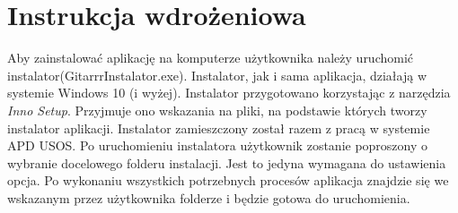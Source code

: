 \chapter{Instrukcja wdrożeniowa}

Aby zainstalować aplikację na komputerze użytkownika należy uruchomić instalator(GitarrrInstalator.exe). Instalator, jak i sama aplikacja, działają w systemie Windows 10 (i wyżej). Instalator przygotowano korzystając z narzędzia \emph{Inno Setup}. Przyjmuje ono wskazania na pliki, na podstawie których tworzy instalator aplikacji. Instalator zamieszczony został razem z pracą w systemie APD USOS.
Po uruchomieniu instalatora użytkownik zostanie poproszony o wybranie docelowego folderu instalacji. Jest to jedyna wymagana do ustawienia opcja. Po wykonaniu wszystkich potrzebnych procesów aplikacja znajdzie się we wskazanym przez użytkownika folderze i będzie gotowa do uruchomienia.
